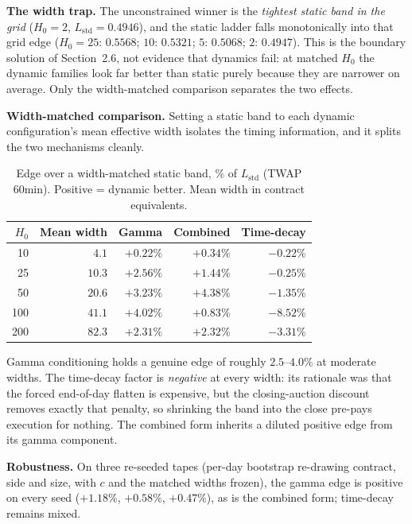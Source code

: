 \documentclass{article}
\begin{document}
\begin{whybox}
\textbf{The width trap.} The unconstrained winner is the \emph{tightest static band in the
grid} ($H_0 = 2$, $L_{\text{std}} = 0.4946$), and the static ladder falls monotonically
into that grid edge ($H_0 = 25$: $0.5568$; $10$: $0.5321$; $5$: $0.5068$; $2$: $0.4947$).
This is the boundary solution of Section~2.6, not evidence that dynamics fail: at matched
$H_0$ the dynamic families look far better than static purely because they are narrower on
average. Only the width-matched comparison separates the two effects.
\end{whybox}

\textbf{Width-matched comparison.} Setting a static band to each dynamic configuration's
mean effective width isolates the timing information, and it splits the two mechanisms
cleanly.

\begin{table}[htbp]
\centering
\small
\begin{tabular}{rrrrr}
\toprule
$H_0$ & \textbf{Mean width} & \textbf{Gamma} & \textbf{Combined} & \textbf{Time-decay} \\
\midrule
10  & $4.1$  & $+0.22\%$ & $+0.34\%$ & $-0.22\%$ \\
25  & $10.3$ & $+2.56\%$ & $+1.44\%$ & $-0.25\%$ \\
50  & $20.6$ & $+3.23\%$ & $+4.38\%$ & $-1.35\%$ \\
100 & $41.1$ & $+4.02\%$ & $+0.83\%$ & $-8.52\%$ \\
200 & $82.3$ & $+2.31\%$ & $+2.32\%$ & $-3.31\%$ \\
\bottomrule
\end{tabular}
\caption{Edge over a width-matched static band, \% of $L_{\text{std}}$ (TWAP 60min).
Positive = dynamic better. Mean width in contract equivalents.}
\end{table}

Gamma conditioning holds a genuine edge of roughly $2.5$--$4.0\%$ at moderate widths. The
time-decay factor is \emph{negative} at every width: its rationale was that the forced
end-of-day flatten is expensive, but the closing-auction discount removes exactly that
penalty, so shrinking the band into the close pre-pays execution for nothing. The combined
form inherits a diluted positive edge from its gamma component.

\textbf{Robustness.} On three re-seeded tapes (per-day bootstrap re-drawing contract, side
and size, with $c$ and the matched widths frozen), the gamma edge is positive on every
seed ($+1.18\%$, $+0.58\%$, $+0.47\%$), as is the combined form; time-decay remains mixed.
\end{document}

